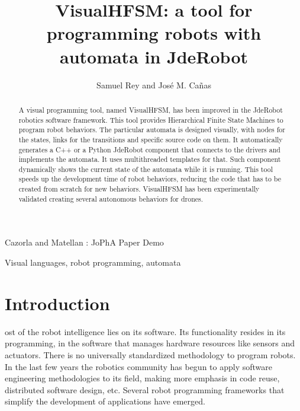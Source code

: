 \documentclass[journal,twoside]{JoPhA}
\begin{document}
\title{VisualHFSM: a tool for programming robots with automata in JdeRobot}
 
\author{Samuel Rey and Jos\'e M. Ca\~nas
}

%
{Cazorla and Matellan : JoPhA Paper Demo}
\maketitle


\begin{abstract}
A visual programming tool, named VisualHFSM, has been improved in the JdeRobot robotics software framework. This tool provides Hierarchical Finite State Machines to program robot behaviors. The particular automata is designed visually, with nodes for the states, links for the transitions and specific source code on them. It automatically generates a C++ or a Python JdeRobot component that connects to the drivers and implements the automata. It uses multithreaded templates for that. Such component dynamically shows the current state of the automata while it is running. This tool speeds up the development time of robot behaviors, reducing the code that has to be created from scratch for new behaviors. VisualHFSM has been experimentally validated creating several autonomous behaviors for drones.
\end{abstract}


\begin{IEEEkeywords}
Visual languages, robot programming, automata
\end{IEEEkeywords}


\section{Introduction}

ost of the robot intelligence lies on its software. Its functionality resides in its programming, in the software that manages hardware resources like sensors and actuators. There is no universally standardized methodology to program robots. In the last few years the robotics community has begun to apply software engineering methodologies to its field, making more emphasis in code reuse, distributed software design, etc. Several robot programming frameworks that simplify the development of applications have emerged. 
\end{document}
